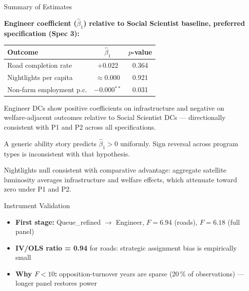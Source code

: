 \documentclass[aspectratio=169]{beamer}
\begin{document}
\begin{frame}{Summary of Estimates}

\textbf{Engineer coefficient ($\hat\beta_1$) relative to Social Scientist baseline, preferred specification (Spec 3):}

\bigskip

{\small
\begin{tabular}{lcc}
\toprule
\textbf{Outcome} & $\hat{\beta}_1$ & $p$-value \\
\midrule
Road completion rate       & $+$0.022       & 0.364 \\
Nightlights per capita     & $\approx 0.000$ & 0.921 \\
Non-farm employment p.c.   & $-$0.000$^{**}$ & 0.031 \\
\bottomrule
\end{tabular}
}

\bigskip

Engineer DCs show positive coefficients on infrastructure and negative on welfare-adjacent outcomes relative to Social Scientist DCs --- directionally consistent with P1 and P2 across all specifications.

\bigskip

A generic ability story predicts $\hat\beta_1 > 0$ uniformly. Sign reversal across program types is inconsistent with that hypothesis.

{\footnotesize Nightlights null consistent with comparative advantage: aggregate satellite luminosity averages infrastructure and welfare effects, which attenuate toward zero under P1 and P2.}

\end{frame}

\begin{frame}{Instrument Validation}
  \begin{center}
  \end{center}
  \vspace{4pt}
  \begin{itemize}\setlength\itemsep{5pt}
    \item \textbf{First stage:} Queue\_refined $\to$ Engineer,
          $F = 6.94$ (roads), $F = 6.18$ (full panel)
    \item \textbf{IV/OLS ratio = 0.94} for roads:
          strategic assignment bias is empirically small
    \item \textbf{Why $F < 10$:} opposition-turnover years are sparse
          (20\,\% of observations) --- longer panel restores power
  \end{itemize}
\end{frame}
\end{document}
